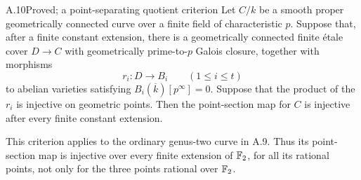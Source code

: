 \begin{claim}{A.10}{Proved; a point-separating quotient criterion}
Let $C/k$ be a smooth proper geometrically connected curve over a
finite field of characteristic $p$. Suppose that, after a finite
constant extension, there is a geometrically connected finite
\'etale cover $D\to C$ with geometrically prime-to-$p$ Galois
closure, together with morphisms
\[
 r_i:D\longrightarrow B_i\qquad(1\le i\le t)
\]
to abelian varieties satisfying
$B_i(\overline k)[p^\infty]=0$. Suppose that the product of the
$r_i$ is injective on geometric points. Then the point-section
map for $C$ is injective after every finite constant extension.

This criterion applies to the ordinary genus-two curve in A.9.
Thus its point-section map is injective over every finite
extension of $\mathbb F_2$, for all its rational points, not only for
the three points rational over $\mathbb F_2$.
\end{claim}
